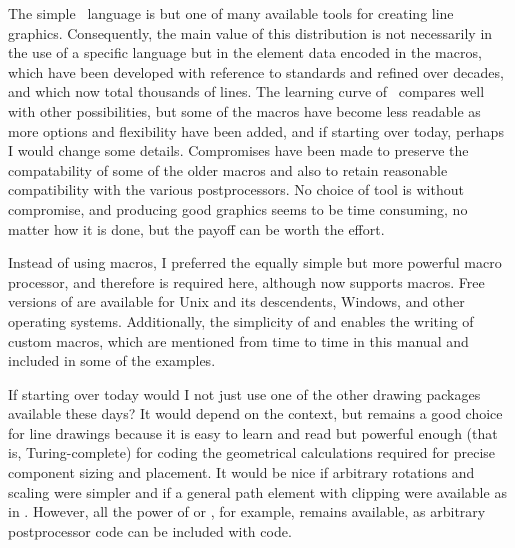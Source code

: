 The simple \pic\ language is but one of many available tools for creating
line graphics.  Consequently, the main value of this distribution
is not necessarily in the use of a specific language but in the
element data encoded in the macros, which have been developed with
reference to standards and refined over decades, and which now total
thousands of lines.  The learning curve of \pic\ compares well with
other possibilities, but some of the macros have become less readable
as more options and flexibility have been added, and if starting
over today, perhaps I would change some details.  Compromises have
been made to preserve the compatability of some of the older macros
and also to retain reasonable compatibility with
the various postprocessors.  No choice of tool is without compromise,
and producing good graphics seems to be time consuming, no matter how
it is done, but the payoff can be worth the effort.

Instead of using \pic macros, I preferred the equally simple but more
powerful \Mfour macro processor, and therefore \Mfour is required here,
although \dpic  now supports \pic macros.  Free versions of \Mfour
are available for Unix and its descendents, Windows, and other operating
systems.  Additionally, the simplicity of \Mfour and \pic enables the
writing of custom macros, which are mentioned from time to time in this
manual and included in some of the examples.

If starting over today would I not just use one of the other drawing
packages available these days?  It would depend on the context, but
\pic remains a good choice for line drawings because it is easy to learn
and read but powerful enough (that is, Turing-complete) for coding the
geometrical calculations required for precise component sizing and
placement. It would be nice if arbitrary rotations and scaling were
simpler and if a general path element with clipping were available
as in \Postscript.  However, all the power of \Postscript or \TPGF,
for example, remains available, as arbitrary postprocessor code can be
included with \pic code.

